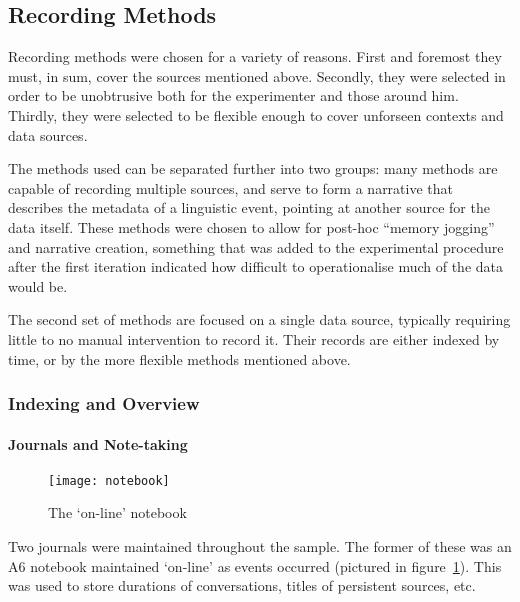 









\subsection{Recording Methods}
Recording methods were chosen for a variety of reasons.  First and foremost they must, in sum, cover the sources mentioned above.  Secondly, they were selected in order to be unobtrusive both for the experimenter and those around him.  Thirdly, they were selected to be flexible enough to cover unforseen contexts and data sources.

The methods used can be separated further into two groups: many methods are capable of recording multiple sources, and serve to form a narrative that describes the metadata of a linguistic event, pointing at another source for the data itself.  These methods were chosen to allow for post-hoc ``memory jogging'' and narrative creation, something that was added to the experimental procedure after the first iteration indicated how difficult to operationalise much of the data would be.

The second set of methods are focused on a single data source, typically requiring little to no manual intervention to record it.  Their records are either indexed by time, or by the more flexible methods mentioned above.


\subsubsection{Indexing and Overview}
\paragraph{Journals and Note-taking}

\begin{figure}[p]
\centering
\texttt{[image: notebook]}
\caption{The `on-line' notebook}
\label{fig:personal:online_notebook}
\end{figure}

Two journals were maintained throughout the sample.  The former of these was an A6 notebook maintained `on-line' as events occurred (pictured in figure~\ref{fig:personal:online_notebook}).  This was used to store durations of conversations, titles of persistent sources, etc.

